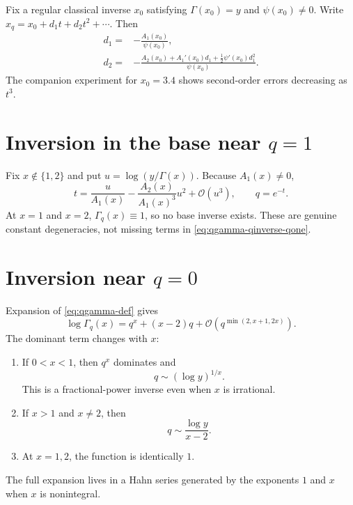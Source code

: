 \documentclass[11pt,oneside]{book}
\theoremstyle{definition}
\theoremstyle{remark}
\newcommand{\OO}{\mathcal{O}}
\begin{document}
Fix a regular classical inverse $x_0$ satisfying $\Gamma(x_0)=y$ and
$\psi(x_0)\ne0$.  Write
$x_q=x_0+d_1t+d_2t^2+\cdots$.  Then
\begin{align}
 d_1={}&-\frac{A_1(x_0)}{\psi(x_0)},\label{eq:qgamma-xinverse-d1}\\
 d_2={}&-\frac{A_2(x_0)+A_1'(x_0)d_1
 +\tfrac12\psi'(x_0)d_1^2}{\psi(x_0)}.
 \label{eq:qgamma-xinverse-d2}
\end{align}
The companion experiment for $x_0=3.4$ shows second-order errors decreasing
as $t^3$.

\section{Inversion in the base near $q=1$}
Fix $x\notin\{1,2\}$ and put
$u=\log(y/\Gamma(x))$.  Because $A_1(x)\ne0$,
\begin{equation}\label{eq:qgamma-qinverse-qone}
 t=\frac{u}{A_1(x)}-\frac{A_2(x)}{A_1(x)^3}u^2
 +\OO(u^3),
 \qquad q=e^{-t}.
\end{equation}
At $x=1$ and $x=2$, $\Gamma_q(x)\equiv1$, so no base inverse exists.  These
are genuine constant degeneracies, not missing terms in
\eqref{eq:qgamma-qinverse-qone}.

\section{Inversion near $q=0$}
Expansion of \eqref{eq:qgamma-def} gives
\begin{equation}\label{eq:qgamma-qzero-direct}
 \log\Gamma_q(x)=q^x+(x-2)q
 +\OO\!\left(q^{\min(2,x+1,2x)}\right).
\end{equation}
The dominant term changes with $x$:
\begin{enumerate}
\item If $0<x<1$, then $q^x$ dominates and
\begin{equation}\label{eq:qgamma-qzero-inverse-subunit}
 q\sim(\log y)^{1/x}.
\end{equation}
This is a fractional-power inverse even when $x$ is irrational.
\item If $x>1$ and $x\ne2$, then
\begin{equation}\label{eq:qgamma-qzero-inverse-superunit}
 q\sim\frac{\log y}{x-2}.
\end{equation}
\item At $x=1,2$, the function is identically $1$.
\end{enumerate}
The full expansion lives in a Hahn series generated by the exponents $1$ and
$x$ when $x$ is nonintegral.
\end{document}
